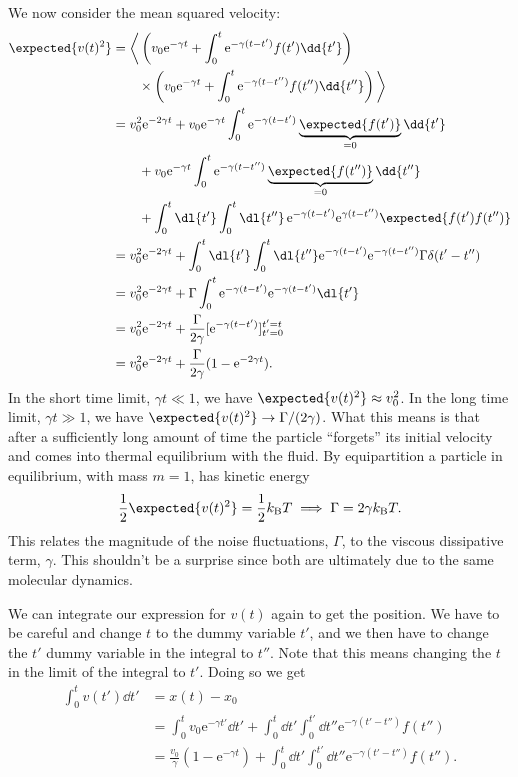 \documentclass[fleqn]{NotesClass}
\newcommand*{\boltzmann}{k_{\mathrm{B}}}
\newcommand*{\e}{\mathrm{e}}
\begin{document}
    We now consider the mean squared velocity:
    \begin{align}
        \expected{v(t)^2} &= \bigg\langle \left( v_0\e^{-\gamma t} + \int_0^t \e^{-\gamma(t - t')}f(t') \dd{t'} \right)\notag\\
        &\qquad \times \left( v_0\e^{-\gamma t} + \int_0^t \e^{-\gamma(t - t'')}f(t'') \dd{t''} \right)\bigg\rangle\\
        &= v_0^2\e^{-2\gamma t} + v_0\e^{-\gamma t}\int_0^t \e^{-\gamma(t - t')} \underbrace{\expected{f(t')}}_{=0} \dd{t'}\notag\\
        &\qquad + v_0\e^{-\gamma t}\int_0^t \e^{-\gamma(t - t'')} \underbrace{\expected{f(t'')}}_{=0} \dd{t''}\notag\\
        &\qquad + \int_0^t \dl{t'} \int_0^t \dl{t''} \, \e^{-\gamma(t - t')} \e^{\gamma(t - t'')} \expected{f(t')f(t'')}\\
        &= v_0^2\e^{-2\gamma t} + \int_0^t \dl{t'} \int_0^t \dl{t''} \e^{-\gamma(t - t')}\e^{-\gamma(t - t'')} \Gamma\delta(t' - t'')\\
        &= v_0^2\e^{-2\gamma t} + \Gamma \int_0^t \e^{-\gamma(t - t')}\e^{-\gamma(t - t')} \dl{t'}\\
        &= v_0^2\e^{-2\gamma t} + \frac{\Gamma}{2\gamma} [\e^{-\gamma(t - t')}]_{t' = 0}^{t' = t}\\
        &= v_0^2\e^{-2\gamma t} + \frac{\Gamma}{2\gamma} (1 - \e^{-2\gamma t}).
    \end{align}
    In the short time limit, \(\gamma t \ll 1\), we have \(\expected{v(t)^2} \approx v_0^2\).
    In the long time limit, \(\gamma t \gg 1\), we have \(\expected{v(t)^2} \to \Gamma / (2\gamma)\).
    What this means is that after a sufficiently long amount of time the particle \enquote{forgets} its initial velocity and comes into thermal equilibrium with the fluid.
    By equipartition a particle in equilibrium, with mass \(m = 1\), has kinetic energy
    \begin{equation}
        \frac{1}{2} \expected{v(t)^2} = \frac{1}{2}\boltzmann T \implies \Gamma = 2\gamma \boltzmann T.
    \end{equation}
    This relates the magnitude of the noise fluctuations, \(\Gamma\), to the viscous dissipative term, \(\gamma\).
    This shouldn't be a surprise since both are ultimately due to the same molecular dynamics.
    
    We can integrate our expression for \(v(t)\) again to get the position.
    We have to be careful and change \(t\) to the dummy variable \(t'\), and we then have to change the \(t'\) dummy variable in the integral to \(t''\).
    Note that this means changing the \(t\) in the limit of the integral to \(t'\).
    Doing so we get
    \begin{align}
        \int_0^t v(t') \dd{t'} &= x(t) - x_0\\
        &= \int_0^t v_0\e^{-\gamma t'} \dd{t'} + \int_0^t \dd{t'} \int_0^{t'} \dd{t''} \e^{-\gamma(t' - t'')} f(t'')\\
        &= \frac{v_0}{\gamma}(1 - \e^{-\gamma t}) + \int_0^t \dd{t'} \int_0^{t'} \dd{t''} \e^{-\gamma(t' - t'')} f(t'').
    \end{align}
    
\end{document}
